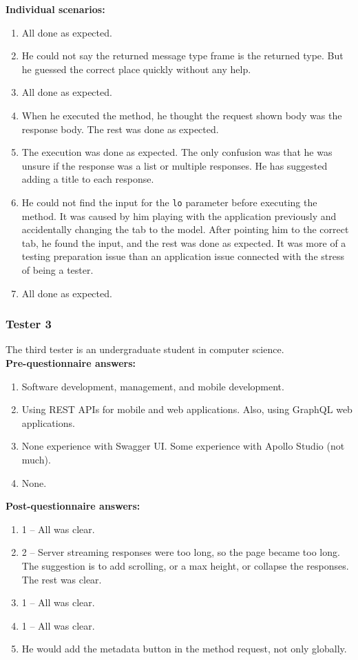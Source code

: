 \textbf{Individual scenarios:}
\begin{enumerate}
    \item All done as expected.
    \item He could not say the returned message type frame is the returned type.
    But he guessed the correct place quickly without any help.
    \item All done as expected.
    \item When he executed the method, he thought the request shown body was the response body.
    The rest was done as expected.
    \item The execution was done as expected.
    The only confusion was that he was unsure if the response was a list or multiple responses.
    He has suggested adding a title to each response.
    \item He could not find the input for the \texttt{lo} parameter before executing the method.
    It was caused by him playing with the application previously and accidentally changing the tab to the model.
    After pointing him to the correct tab, he found the input, and the rest was done as expected.
    It was more of a testing preparation issue than an application issue connected with the stress of being a tester.
    \item All done as expected.
\end{enumerate}

\subsubsection{Tester 3}
The third tester is an undergraduate student in computer science.\\

\textbf{Pre-questionnaire answers:}
\begin{enumerate}
    \item Software development, management, and mobile development.
    \item Using REST APIs for mobile and web applications.
    Also, using GraphQL web applications.
    \item None experience with Swagger UI\@.
    Some experience with Apollo Studio (not much).
    \item None.
\end{enumerate}

\textbf{Post-questionnaire answers:}
\begin{enumerate}
    \item 1 -- All was clear.
    \item 2 -- Server streaming responses were too long, so the page became too long.
    The suggestion is to add scrolling, or a max height, or collapse the responses.
    The rest was clear.
    \item 1 -- All was clear.
    \item 1 -- All was clear.
    \item He would add the metadata button in the method request, not only globally.
\end{enumerate}

